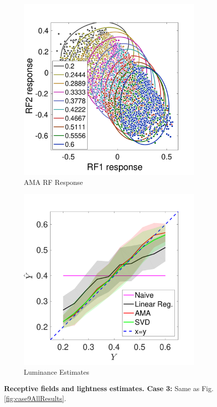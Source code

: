 \documentclass{jov}
\begin{document}
\begin{figure}
\begin{subfigure}[b]{0.20 \textwidth}
        \includegraphics[width=\textwidth]{Figure7/case12FiltersResponse.pdf}
        \caption{AMA RF Response}
        \label{fig:case12FiltersResponse}
    \end{subfigure}    
        \begin{subfigure}[b]{0.2 \textwidth}
        \includegraphics[width=\textwidth]{Figure7/case12Results.pdf}
        \caption{Luminance Estimates}
        \label{fig:case12Results}
    \end{subfigure}
    \label{fig:case12AllResults}
    \caption{{\bf Receptive fields and lightness estimates. Case 3:}  Same as Fig. \ref{fig:case9AllResults}.}
\end{figure}
\end{document}
